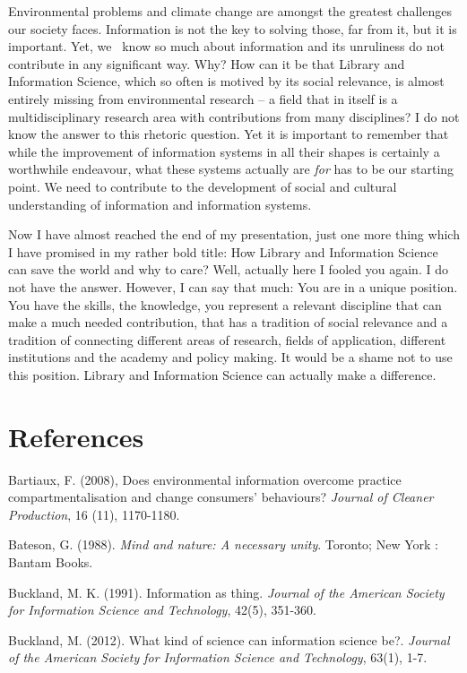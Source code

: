 \documentclass[a4paper,
fontsize=11pt,
oneside,
numbers=noperiodatend,
parskip=half-,
bibliography=totoc,
final
]{scrartcl}
\begin{document}
Environmental problems and climate change are amongst the greatest
challenges our society faces. Information is not the key to solving
those, far from it, but it is important. Yet, we~ know so much about
information and its unruliness do not contribute in any significant way.
Why? How can it be that Library and Information Science, which so often
is motived by its social relevance, is almost entirely missing from
environmental research -- a field that in itself is a multidisciplinary
research area with contributions from many disciplines? I do not know
the answer to this rhetoric question. Yet it is important to remember
that while the improvement of information systems in all their shapes is
certainly a worthwhile endeavour, what these systems actually are
\emph{for} has to be our starting point. We need to contribute to the
development of social and cultural understanding of information and
information systems.

Now I have almost reached the end of my presentation, just one more
thing which I have promised in my rather bold title: How Library and
Information Science can save the world and why to care? Well, actually
here I fooled you again. I do not have the answer. However, I can say
that much: You are in a unique position. You have the skills, the
knowledge, you represent a relevant discipline that can make a much
needed contribution, that has a tradition of social relevance and a
tradition of connecting different areas of research, fields of
application, different institutions and the academy and policy making.
It would be a shame not to use this position. Library and Information
Science can actually make a difference.

\section*{References}\label{references}

Bartiaux, F. (2008), Does environmental information overcome practice
compartmentalisation and change consumers' behaviours? \emph{Journal of
Cleaner Production}, 16 (11), 1170-1180.

Bateson, G. (1988). \emph{Mind and nature: A necessary unity}. Toronto;
New York : Bantam Books.

Buckland, M. K. (1991). Information as thing. \emph{Journal of the
American Society for Information Science and Technology}, 42(5),
351-360.

Buckland, M. (2012). What kind of science can information science be?.
\emph{Journal of the American Society for Information Science and
Technology}, 63(1), 1-7.
\end{document}

